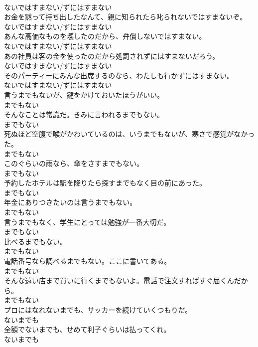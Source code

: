 \documentclass[8pt]{extreport}
\begin{document}
\begin{CJK}{UTF8}{min}
\\	ないではすまない/ずにはすまない	
\\	お金を黙って持ち出したなんて、親に知られたら叱られないではすまないぞ。	
\\	ないではすまない/ずにはすまない	
\\	あんな高価なものを壊したのだから、弁償しないではすまない。	
\\	ないではすまない/ずにはすまない	
\\	あの社員は客の金を使ったのだから処罰されずにはすまないだろう。	
\\	ないではすまない/ずにはすまない	
\\	そのパーティーにみんな出席するのなら、わたしも行かずにはすまない。	
\\	ないではすまない/ずにはすまない	
\\	言うまでもないが、鍵をかけておいたほうがいい。	
\\	までもない	
\\	そんなことは常識だ。きみに言われるまでもない。	
\\	までもない	
\\	死ぬほど空腹で喉がかわいているのは、いうまでもないが、寒さで感覚がなかった。	
\\	までもない	
\\	このぐらいの雨なら、傘をさすまでもない。	
\\	までもない	
\\	予約したホテルは駅を降りたら探すまでもなく目の前にあった。	
\\	までもない	
\\	年金にありつきたいのは言うまでもない。	
\\	までもない	
\\	言うまでもなく、学生にとっては勉強が一番大切だ。	
\\	までもない	
\\	比べるまでもない。	
\\	までもない	
\\	電話番号なら調べるまでもない。ここに書いてある。	
\\	までもない	
\\	そんな遠い店まで買いに行くまでもないよ。電話で注文すればすぐ届くんだから。	
\\	までもない	
\\	プロにはなれないまでも、サッカーを続けていくつもりだ。	
\\	ないまでも	
\\	全額でないまでも、せめて利子ぐらいは払ってくれ。	
\\	ないまでも	

\end{CJK}
\end{document}
